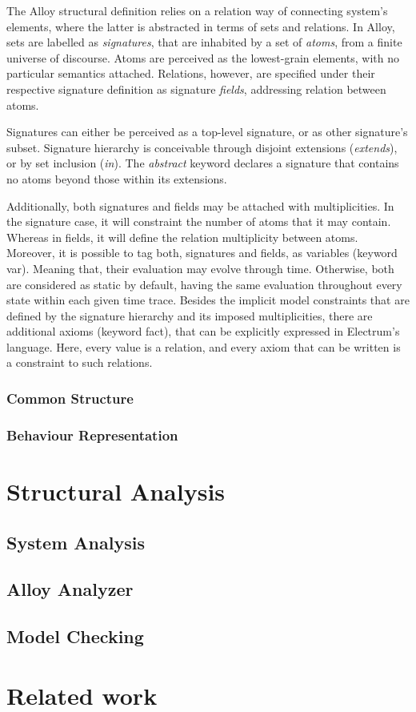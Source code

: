 The Alloy structural definition relies on a relation way of connecting system's elements, where the latter is abstracted in terms of sets and relations. In Alloy, sets are labelled as \textit{signatures}, that are inhabited by a set of \textit{atoms}, from a finite universe of discourse. Atoms are perceived as the lowest-grain elements, with no particular semantics attached. Relations, however, are specified under their respective signature definition as signature \textit{fields}, addressing relation between atoms.

Signatures can either be perceived as a top-level signature, or as other signature's subset. Signature hierarchy is conceivable through disjoint extensions (\textit{extends}), or by set inclusion (\textit{in}). The \textit{abstract} keyword declares a signature that contains no atoms beyond those within its extensions.

Additionally, both signatures and fields may be attached with multiplicities. In the signature case, it will constraint the number of atoms that it may contain. Whereas in fields, it will define the relation multiplicity between atoms. Moreover, it is possible to tag both, signatures and fields, as variables (keyword var). Meaning that, their evaluation may evolve through time. Otherwise, both are considered as static by default, having the same evaluation throughout every state within each given time trace. Besides the implicit model constraints that are defined by the signature hierarchy and its imposed multiplicities, there are additional axioms (keyword fact), that can be explicitly expressed in Electrum’s language. Here, every value is a relation, and every axiom that can be written is a constraint to such relations.

\subsubsection{Common Structure}

\subsubsection{Behaviour Representation}

\section{Structural Analysis}

\subsection{System Analysis}

\subsection{Alloy Analyzer}

\subsection{Model Checking}

\section{Related work}\label{s:alloy-relWork}
